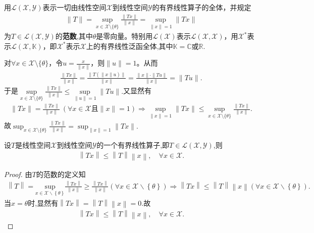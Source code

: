 \documentclass[../../main.tex]{subfiles}%
\begin{document}
\begin{definition}
用$\mathscr{L}(\mathscr{X},\mathscr{Y})$表示一切由线性空间$\mathscr{X}$到线性空间$\mathscr{Y}$的有界线性算子的全体，并规定
\begin{align*}
\|T\|=\sup_{x\in\mathscr{X}\setminus\{\theta\}}\frac{\|Tx\|}{\|x\|}=\sup_{\|x\|=1}\|Tx\|
\end{align*}
为$T\in\mathscr{L}(\mathscr{X},\mathscr{Y})$的\textbf{范数},其中$\theta$是零向量。特别用$\mathscr{L}(\mathscr{X})$表示$\mathscr{L}(\mathscr{X},\mathscr{X})$，用$\mathscr{X}^*$表示$\mathscr{L}(\mathscr{X},\mathbb{K})$，即$\mathscr{X}^*$表示$\mathscr{X}$上的有界线性泛函全体,其中$\mathbb{K}=\mathbb{C}\text{或}\mathbb{R}$.
\end{definition}
\begin{remark}
对$\forall x\in \mathscr{X} \setminus \{\theta\}$，令$u=\frac{x}{\|x\|}$，则$\|u\|=1$。从而
\begin{align*}
\frac{\|Tx\|}{\|x\|}=\frac{\|T(\|x\| u)\|}{\|x\|}=\frac{\|x\| \cdot \|Tu\|}{\|x\|}=\|Tu\|.
\end{align*}
于是$\sup\limits_{x\in \mathscr{X} \setminus \{\theta\}}\frac{\|Tx\|}{\|x\|}\leqslant \sup\limits_{\|u\|=1}\|Tu\|.$又显然有
\begin{align*}
\|Tx\|=\frac{\|Tx\|}{\|x\|}\ (\forall x\in \mathscr{X}且\|x\|=1)\Longrightarrow \sup\limits_{\|x\|=1}\|Tx\|\leqslant \sup\limits_{x\in \mathscr{X} \setminus \{\theta\}}\frac{\|Tx\|}{\|x\|}.
\end{align*}
故$\sup_{x\in\mathscr{X}\setminus\{\theta\}}\frac{\|Tx\|}{\|x\|}=\sup_{\|x\|=1}\|Tx\|.$
\end{remark}

\begin{proposition}\label{proposition:有界线性算子的基本不等式}
设$T$是线性空间$\mathscr{X}$到线性空间$\mathscr{Y}$的一个有界线性算子,即$T\in \mathscr{L}(\mathscr{X},\mathscr{Y})$,则
\begin{align*}
\left\| Tx \right\| \leqslant \left\| T \right\| \left\| x \right\| ,\quad \forall x\in \mathscr{X} .
\end{align*}
\end{proposition}
\begin{proof}
由$T$的范数的定义知
\begin{align*}
\left\| T \right\| =\underset{x\in \mathscr{X} \backslash \left\{ \theta \right\}}{\mathrm{sup}}\frac{\left\| Tx \right\|}{\left\| x \right\|}\geqslant \frac{\left\| Tx \right\|}{\left\| x \right\|}\left( \forall x\in \mathscr{X} \backslash \left\{ \theta \right\} \right) \Longrightarrow \left\| Tx \right\| \leqslant \left\| T \right\| \left\| x \right\| \left( \forall x\in \mathscr{X} \backslash \left\{ \theta \right\} \right) .
\end{align*}
当$x=\theta$时,显然有$\left\| Tx \right\| =\left\| T \right\| \left\| x \right\| =0.$故
\begin{align*}
\left\| Tx \right\| \leqslant \left\| T \right\| \left\| x \right\| ,\quad \forall x\in \mathscr{X} .
\end{align*}
\end{proof}
\end{document}
